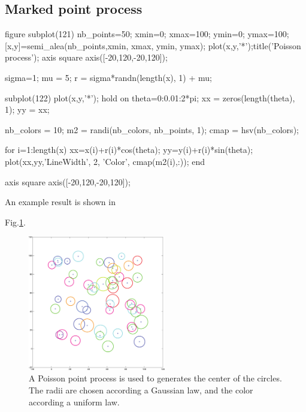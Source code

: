 \subsection{Marked point process}
\begin{matlab}
figure
subplot(121)
nb_points=50;
xmin=0;
xmax=100;
ymin=0;
ymax=100;
[x,y]=semi_alea(nb_points,xmin, xmax, ymin, ymax);
plot(x,y,'*');title('Poisson process');
axis square
axis([-20,120,-20,120]);

sigma=1;
mu = 5;
r = sigma*randn(length(x), 1) + mu;

subplot(122)
plot(x,y,'*'); 
hold on
theta=0:0.01:2*pi;
xx = zeros(length(theta), 1);
yy = xx;

nb_colors = 10;
m2 = randi(nb_colors, nb_points, 1);
cmap =  hsv(nb_colors);

for i=1:length(x)
    xx=x(i)+r(i)*cos(theta);
    yy=y(i)+r(i)*sin(theta);
    plot(xx,yy,'LineWidth', 2, 'Color', cmap(m2(i),:));
end

axis square
axis([-20,120,-20,120]);
\end{matlab}

An example result is shown in 
{Fig.\ref{fig:point_process_generation:matlab:circles}.

\begin{figure}[htbp]
 \centering
 \includegraphics[width=6cm]{circles.pdf}
 \caption{A Poisson point process is used to generates the center of the circles. The radii are chosen according a Gaussian law, and the 
color according a uniform law.}
 \label{fig:point_process_generation:matlab:circles}
\end{figure}
}

